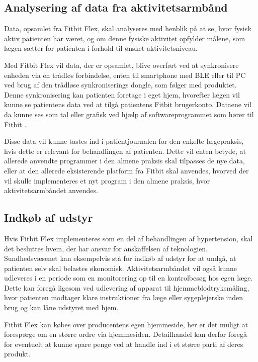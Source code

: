 \subsection{Analysering af data fra aktivitetsarmbånd}  
Data, opsamlet fra Fitbit Flex, skal analyseres med henblik på at se, hvor fysisk aktiv patienten har været, og om denne fysiske aktivitet opfylder målene, som lægen sætter for patienten i forhold til ønsket aktivitetsniveau. 

Med Fitbit Flex vil data, der er opsamlet, blive overført ved at synkronisere enheden via en trådløs forbindelse, enten til smartphone med BLE eller til PC ved brug af den trådløse synkroniserings dongle, som følger med produktet. Denne synkronisering kan patienten foretage i eget hjem, hvorefter lægen vil kunne se patientens data  ved at tilgå patientens Fitbit brugerkonto. Dataene vil da kunne ses som tal eller grafisk ved hjælp af softwareprogrammet som hører til Fitbit \citep{fitbitflex}. 

Disse data vil kunne tastes ind i patientjournalen for den enkelte lægepraksis, hvis dette er relevant for behandlingen af patienten. Dette vil enten betyde, at allerede anvendte programmer i den almene praksis skal tilpasses de nye data, eller at den allerede eksisterende platform fra Fitbit skal anvendes, hvorved der vil skulle implementeres et nyt program i den almene praksis, hvor aktivitetsarmbåndet anvendes. 

\subsection{Indkøb af udstyr}	

Hvis Fitbit Flex implementeres som en del af behandlingen af hypertension, skal det besluttes hvem, der har ansvar for anskaffelsen af teknologien. Sundhedsvæsenet kan eksempelvis stå for indkøb af udstyr for at undgå, at patienten selv skal belastes økonomisk. Aktivitetsarmbåndet vil også kunne udleveres i en periode som en monitorering op til en kontrolbesøg hos egen læge. Dette kan foregå ligesom ved udlevering af apparat til hjemmeblodtryksmåling, hvor patienten modtager klare instruktioner fra læge eller sygeplejerske inden brug og kan låne udstyret med hjem.

Fitbit Flex kan købes over producentens egen hjemmeside, her er det muligt at forespørge om en større ordre via hjemmesiden. Detailhandel kan derfor foregå for eventuelt at kunne spare penge ved at handle ind i et større parti af deres produkt.

